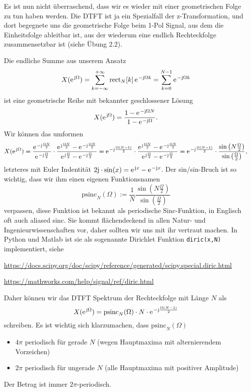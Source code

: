 \begin{ExCalc}
Es ist nun nicht überraschend, dass wir es wieder mit einer geometrischen
Folge zu tun haben werden.
%
Die DTFT ist ja ein Spezialfall der z-Transformation, und dort begegnete uns
die geometrische Folge beim 1-Pol Signal, aus dem die Einheitsfolge ableitbar ist,
aus der wiederum eine endlich Rechteckfolge zusammensetzbar ist (siehe Übung 2.2).

Die endliche Summe aus unserem Ansatz
\begin{align}
X(\e^{\im\Omega})
= \sum_{k=-\infty}^{+\infty} \mathrm{rect}_N[k] \, \e^{-\im\Omega k} = \sum_{k=0}^{N-1} \e^{-\im\Omega k}
\end{align}
ist eine geometrische Reihe mit bekannter geschlossener Lösung
\begin{equation}
X(\e^{\im\Omega})=\frac{1-\e^{-\im\Omega N}}{1-\e^{-\im\Omega}}.
\end{equation}
%
Wir können das umformen
%
\begin{equation}
X(\e^{\im\Omega})=\frac{\e^{-\im\frac{\Omega N}{2}}}{\e^{-\im\frac{\Omega}{2}}}\cdot\frac{\e^{\im\frac{\Omega N}{2}}-\e^{-\im\frac{\Omega N}{2}}}{\e^{\im\frac{\Omega}{2}}-\e^{-\im\frac{\Omega}{2}}}
=\e^{-\im\frac{\Omega(N-1)}{2}}\cdot\frac{\e^{\im\frac{\Omega N}{2}}-\e^{-\im\frac{\Omega N}{2}}}{\e^{\im\frac{\Omega}{2}}-\e^{-\im\frac{\Omega}{2}}}
=\e^{-\im\frac{\Omega(N-1)}{2}}\cdot\frac{\sin\left(N\frac{\Omega}{2}\right)}{\sin\left(\frac{\Omega}{2}\right)},
\end{equation}
%
letzteres mit Euler Indentität $2\im\cdot\sin(x)=\e^{\im x}-\e^{-\im x}$.
%
Der sin/sin-Bruch ist so wichtig, dass wir ihm einen eigenen Funktionsnamen
\begin{equation}
\mathrm{psinc}_N(\Omega) := \frac{1}{N}\frac{\sin\left(N\frac{\Omega}{2}\right)}{\sin\left(\frac{\Omega}{2}\right)}
\end{equation}
verpassen, diese Funktion ist bekannt als periodische Sinc-Funktion, in Englisch
oft auch aliased sinc.
%
Sie kommt flächendeckend in allen Natur- und Ingenieurwissenschaften vor, daher
sollten wir uns mit ihr vertraut machen.
%
In Python und Matlab ist sie als sogenannte Dirichlet Funktion \texttt{diric(x,N)}
implementiert, siehe

\url{https://docs.scipy.org/doc/scipy/reference/generated/scipy.special.diric.html}

\url{https://mathworks.com/help/signal/ref/diric.html}

Daher können wir das DTFT Spektrum der Rechteckfolge mit Länge $N$ als
\begin{equation}
X(\e^{\im\Omega})=
\mathrm{psinc}_N(\Omega) \cdot N \cdot \e^{-\im\frac{\Omega(N-1)}{2}}
\end{equation}
schreiben.
%
Es ist wichtig sich klarzumachen, dass $\mathrm{psinc}_N(\Omega)$
\begin{itemize}
\item $4\pi$ periodisch für gerade $N$ (wegen Hauptmaxima mit alternierendem Vorzeichen)
\item $2\pi$ periodisch für ungerade $N$ (alle Hauptmaxima mit positiver Amplitude)
\end{itemize}
Der Betrag ist immer $2\pi$-periodisch.
\end{ExCalc}


